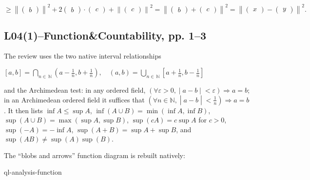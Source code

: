 \(\geq \left\| \begin{pmatrix}
b
\end{pmatrix} \right\|^{2} + 2\begin{pmatrix}
b
\end{pmatrix} \cdot \begin{pmatrix}
c
\end{pmatrix} + \left\| \begin{pmatrix}
c
\end{pmatrix} \right\|^{2} = \left\| {\begin{pmatrix}
b
\end{pmatrix} + \begin{pmatrix}
c
\end{pmatrix}} \right\|^{2} = \left\| {\begin{pmatrix}
x
\end{pmatrix} - \begin{pmatrix}
y
\end{pmatrix}} \right\|^{2}.\)

\subsection{L04(1)--Function\&Countability, pp. 1--3}

The review uses the two native interval relationships

\(\left\lbrack {a,b} \right\rbrack = \bigcap_{n \in \ \mathbb{N}}\left( {a - \frac{1}{n},b + \frac{1}{n}} \right),\quad\left( {a,b} \right) = \bigcup_{n \in \ \mathbb{N}}\left\lbrack {a + \frac{1}{n},b - \frac{1}{n}} \right\rbrack\)

and the Archimedean test: in any ordered field, \(\left( \forall\varepsilon > 0, \middle| a - b \middle| < \varepsilon \right)\Rightarrow a = b\); in an Archimedean ordered field it suffices that \(\left( \forall n \in \mathbb{N}, \middle| a - b \middle| < \frac{1}{n} \right)\Rightarrow a = b\). It then lists \(\inf A \leq \sup A\), \(\inf\left( {A \cup B} \right) = \min\left( {\inf A,\inf B} \right)\), \(\sup\left( {A \cup B} \right) = \max\left( {\sup A,\sup B} \right)\), \(\sup\left( {cA} \right) = c\sup A\) for \(c > 0\), \(\sup\left( {- A} \right) = - \inf A\), \(\sup\left( {A + B} \right) = \sup A + \sup B\), and \(\sup\left( {AB} \right) \neq \sup(A)\sup(B)\).

The ``blobs and arrows'' function diagram is rebuilt natively:

\begin{center}
\begin{qldrawing}
\csname ql-analysis-function\endcsname
\end{qldrawing}
\end{center}

